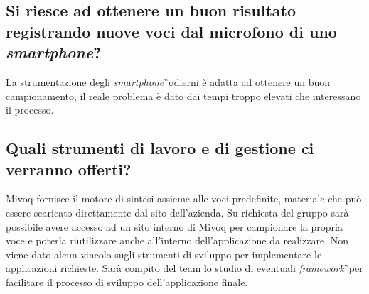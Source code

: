 \subsection{Si riesce ad ottenere un buon risultato registrando nuove voci dal 
microfono di uno \textit{smartphone}\G?}
La strumentazione degli \textit{smartphone}\G\ odierni è adatta ad ottenere un 
buon campionamento, il reale problema è dato dai tempi troppo elevati che 
interessano il processo.

\subsection{Quali strumenti di lavoro e di gestione ci verranno offerti?}
Mivoq fornisce il motore di sintesi assieme alle voci predefinite, materiale 
che può essere scaricato direttamente dal sito dell'azienda. Su richiesta del 
gruppo sarà possibile avere accesso ad un sito interno di Mivoq per campionare 
la propria voce e poterla riutilizzare anche all'interno dell'applicazione da 
realizzare. Non viene dato alcun vincolo sugli strumenti di sviluppo per 
implementare le applicazioni richieste. Sarà compito del team lo studio di 
eventuali \textit{framework}\G\ per facilitare il processo di sviluppo 
dell'applicazione finale.

